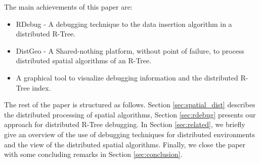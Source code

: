 The main achievements of this paper are:

\begin{itemize}
  \item RDebug - A debugging technique to the data insertion algorithm in a distributed R-Tree.
  \item DistGeo - A Shared-nothing platform, without point of failure, to process distributed spatial algorithms of an R-Tree.
  \item A graphical tool to visualize debugging information and the distributed R-Tree index.
\end{itemize}

The rest of the paper is structured as follows. Section \ref{sec:spatial_dist} describes the distributed processing of spatial algorithms, Section \ref{sec:rdebug} presents our approach for distributed R-Tree debugging. In Section \ref{sec:related}, we briefly give an overview of the use of debugging techniques for distributed environments and the view of the distributed spatial algorithms. Finally, we close the paper with some concluding remarks in Section \ref{sec:conclusion}.